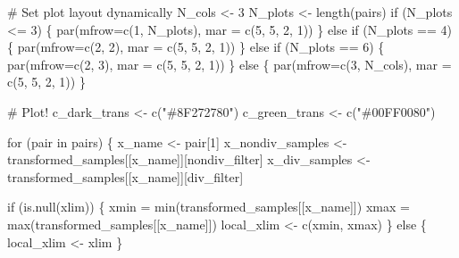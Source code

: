 \documentclass[
  letterpaper,
  DIV=11,
  numbers=noendperiod]{scrartcl}
\newenvironment{Shaded}{\begin{snugshade}}{\end{snugshade}}
\newcommand{\BuiltInTok}[1]{\textcolor[rgb]{0.00,0.23,0.31}{#1}}
\newcommand{\CommentTok}[1]{\textcolor[rgb]{0.37,0.37,0.37}{#1}}
\newcommand{\ControlFlowTok}[1]{\textcolor[rgb]{0.00,0.23,0.31}{#1}}
\newcommand{\DecValTok}[1]{\textcolor[rgb]{0.68,0.00,0.00}{#1}}
\newcommand{\KeywordTok}[1]{\textcolor[rgb]{0.00,0.23,0.31}{#1}}
\newcommand{\NormalTok}[1]{\textcolor[rgb]{0.00,0.23,0.31}{#1}}
\newcommand{\OperatorTok}[1]{\textcolor[rgb]{0.37,0.37,0.37}{#1}}
\newcommand{\StringTok}[1]{\textcolor[rgb]{0.13,0.47,0.30}{#1}}
\begin{document}
\begin{Shaded}
\begin{Highlighting}[]
  \CommentTok{\# Set plot layout dynamically}
\NormalTok{  N\_cols }\OperatorTok{\textless{}{-}} \DecValTok{3}
\NormalTok{  N\_plots }\OperatorTok{\textless{}{-}}\NormalTok{ length(pairs)}
  \ControlFlowTok{if}\NormalTok{ (N\_plots }\OperatorTok{\textless{}=} \DecValTok{3}\NormalTok{) \{}
\NormalTok{    par(mfrow}\OperatorTok{=}\NormalTok{c(}\DecValTok{1}\NormalTok{, N\_plots), mar }\OperatorTok{=}\NormalTok{ c(}\DecValTok{5}\NormalTok{, }\DecValTok{5}\NormalTok{, }\DecValTok{2}\NormalTok{, }\DecValTok{1}\NormalTok{))}
\NormalTok{  \} }\ControlFlowTok{else} \ControlFlowTok{if}\NormalTok{ (N\_plots }\OperatorTok{==} \DecValTok{4}\NormalTok{) \{}
\NormalTok{    par(mfrow}\OperatorTok{=}\NormalTok{c(}\DecValTok{2}\NormalTok{, }\DecValTok{2}\NormalTok{), mar }\OperatorTok{=}\NormalTok{ c(}\DecValTok{5}\NormalTok{, }\DecValTok{5}\NormalTok{, }\DecValTok{2}\NormalTok{, }\DecValTok{1}\NormalTok{))}
\NormalTok{  \} }\ControlFlowTok{else} \ControlFlowTok{if}\NormalTok{ (N\_plots }\OperatorTok{==} \DecValTok{6}\NormalTok{) \{}
\NormalTok{    par(mfrow}\OperatorTok{=}\NormalTok{c(}\DecValTok{2}\NormalTok{, }\DecValTok{3}\NormalTok{), mar }\OperatorTok{=}\NormalTok{ c(}\DecValTok{5}\NormalTok{, }\DecValTok{5}\NormalTok{, }\DecValTok{2}\NormalTok{, }\DecValTok{1}\NormalTok{))}
\NormalTok{  \} }\ControlFlowTok{else}\NormalTok{ \{}
\NormalTok{    par(mfrow}\OperatorTok{=}\NormalTok{c(}\DecValTok{3}\NormalTok{, N\_cols), mar }\OperatorTok{=}\NormalTok{ c(}\DecValTok{5}\NormalTok{, }\DecValTok{5}\NormalTok{, }\DecValTok{2}\NormalTok{, }\DecValTok{1}\NormalTok{))}
\NormalTok{  \}}
  
  \CommentTok{\# Plot!}
\NormalTok{  c\_dark\_trans }\OperatorTok{\textless{}{-}}\NormalTok{ c(}\StringTok{"\#8F272780"}\NormalTok{)}
\NormalTok{  c\_green\_trans }\OperatorTok{\textless{}{-}}\NormalTok{ c(}\StringTok{"\#00FF0080"}\NormalTok{)}
  
  \ControlFlowTok{for}\NormalTok{ (pair }\KeywordTok{in}\NormalTok{ pairs) \{}
\NormalTok{    x\_name }\OperatorTok{\textless{}{-}}\NormalTok{ pair[}\DecValTok{1}\NormalTok{]}
\NormalTok{    x\_nondiv\_samples }\OperatorTok{\textless{}{-}}\NormalTok{ transformed\_samples[[x\_name]][nondiv\_filter]}
\NormalTok{    x\_div\_samples    }\OperatorTok{\textless{}{-}}\NormalTok{ transformed\_samples[[x\_name]][div\_filter]}
    
    \ControlFlowTok{if}\NormalTok{ (}\KeywordTok{is}\NormalTok{.null(xlim)) \{}
\NormalTok{      xmin }\OperatorTok{=} \BuiltInTok{min}\NormalTok{(transformed\_samples[[x\_name]])}
\NormalTok{      xmax }\OperatorTok{=} \BuiltInTok{max}\NormalTok{(transformed\_samples[[x\_name]])}
\NormalTok{      local\_xlim }\OperatorTok{\textless{}{-}}\NormalTok{ c(xmin, xmax)}
\NormalTok{    \} }\ControlFlowTok{else}\NormalTok{ \{}
\NormalTok{      local\_xlim }\OperatorTok{\textless{}{-}}\NormalTok{ xlim}
\NormalTok{    \}}
    

\end{Highlighting}
\end{Shaded}
\end{document}

